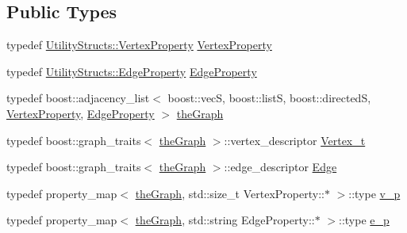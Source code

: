 \subsection*{Public Types}
\begin{DoxyCompactItemize}
\item 
typedef \hyperlink{struct_utility_structs_1_1_vertex_property}{Utility\+Structs\+::\+Vertex\+Property} \hyperlink{class_graph_component_a7c0fcb3f03bf188b7df520e0cdd364b7}{Vertex\+Property}
\item 
typedef \hyperlink{struct_utility_structs_1_1_edge_property}{Utility\+Structs\+::\+Edge\+Property} \hyperlink{class_graph_component_ae2f6ef4a3ac656d8213df42aa3d4c3b3}{Edge\+Property}
\item 
typedef boost\+::adjacency\+\_\+list$<$ boost\+::vecS, boost\+::listS, boost\+::directedS, \hyperlink{class_graph_component_a7c0fcb3f03bf188b7df520e0cdd364b7}{Vertex\+Property}, \hyperlink{class_graph_component_ae2f6ef4a3ac656d8213df42aa3d4c3b3}{Edge\+Property} $>$ \hyperlink{class_graph_component_a982e0748a6e1b8dc74986f5f8b3dca5c}{the\+Graph}
\item 
typedef boost\+::graph\+\_\+traits$<$ \hyperlink{class_graph_component_a982e0748a6e1b8dc74986f5f8b3dca5c}{the\+Graph} $>$\+::vertex\+\_\+descriptor \hyperlink{class_graph_component_ae67114a6ce5a001dc35e1996e1b45aa0}{Vertex\+\_\+t}
\item 
typedef boost\+::graph\+\_\+traits$<$ \hyperlink{class_graph_component_a982e0748a6e1b8dc74986f5f8b3dca5c}{the\+Graph} $>$\+::edge\+\_\+descriptor \hyperlink{class_graph_component_aa7517b2af08aa717324076a645c73fe6}{Edge}
\item 
typedef property\+\_\+map$<$ \hyperlink{class_graph_component_a982e0748a6e1b8dc74986f5f8b3dca5c}{the\+Graph}, std\+::size\+\_\+t Vertex\+Property\+::$\ast$ $>$\+::type \hyperlink{class_graph_component_ad40772702161324303e24463a63738e9}{v\+\_\+p}
\item 
typedef property\+\_\+map$<$ \hyperlink{class_graph_component_a982e0748a6e1b8dc74986f5f8b3dca5c}{the\+Graph}, std\+::string Edge\+Property\+::$\ast$ $>$\+::type \hyperlink{class_graph_component_a22292bf7520fb476958c508d66f5d318}{e\+\_\+p}
\end{DoxyCompactItemize}
